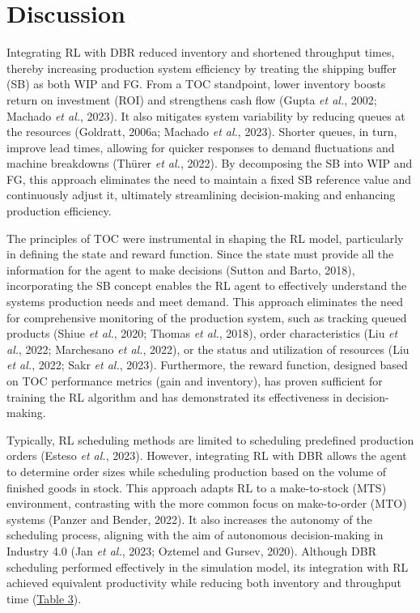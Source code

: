 \section{Discussion}\label{discussion}

Integrating RL with DBR reduced inventory and shortened throughput
times, thereby increasing production system efficiency by treating the
shipping buffer (SB) as both WIP and FG. From a TOC standpoint, lower
inventory boosts return on investment (ROI) and strengthens cash flow
(Gupta \emph{et al.}, 2002; Machado \emph{et al.}, 2023). It also
mitigates system variability by reducing queues at the resources
(Goldratt, 2006a; Machado \emph{et al.}, 2023). Shorter queues, in turn,
improve lead times, allowing for quicker responses to demand
fluctuations and machine breakdowns (Thürer \emph{et al.}, 2022). By
decomposing the SB into WIP and FG, this approach eliminates the need to
maintain a fixed SB reference value and continuously adjust it,
ultimately streamlining decision-making and enhancing production
efficiency.

The principles of TOC were instrumental in shaping the RL model,
particularly in defining the state and reward function. Since the state
must provide all the information for the agent to make decisions (Sutton
and Barto, 2018), incorporating the SB concept enables the RL agent to
effectively understand the system\textquotesingle s production needs and
meet demand. This approach eliminates the need for comprehensive
monitoring of the production system, such as tracking queued products
(Shiue \emph{et al.}, 2020; Thomas \emph{et al.}, 2018), order
characteristics (Liu \emph{et al.}, 2022; Marchesano \emph{et al.},
2022), or the status and utilization of resources (Liu \emph{et al.},
2022; Sakr \emph{et al.}, 2023). Furthermore, the reward function,
designed based on TOC performance metrics (gain and inventory), has
proven sufficient for training the RL algorithm and has demonstrated its
effectiveness in decision-making.

Typically, RL scheduling methods are limited to scheduling predefined
production orders (Esteso \emph{et al.}, 2023). However, integrating RL
with DBR allows the agent to determine order sizes while scheduling
production based on the volume of finished goods in stock. This approach
adapts RL to a make-to-stock (MTS) environment, contrasting with the
more common focus on make-to-order (MTO) systems (Panzer and Bender,
2022). It also increases the autonomy of the scheduling process,
aligning with the aim of autonomous decision-making in Industry 4.0 (Jan
\emph{et al.}, 2023; Oztemel and Gursev, 2020). Although DBR scheduling
performed effectively in the simulation model, its integration with RL
achieved equivalent productivity while reducing both inventory and
throughput time (\colorbox{yellow!40}{}\hyperref[_Ref187517192]{Table 3}).

